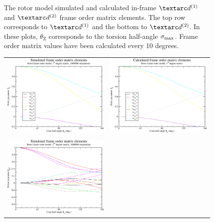 \begin{figure}
\begin{tabular}{@{}cc@{}}
  \end{tabular}
  \caption[Rotor simulated and calculated in-frame Daeg$^{(1)}$ and Daeg$^{(2)}$ elements.]{
    The rotor model simulated and calculated in-frame $\FOone$ and $\FOtwo$ frame order matrix elements.
    The top row corresponds to $\FOone$ and the bottom to $\FOtwo$.
    In these plots, $\theta_\textrm{Z}$ corresponds to the torsion half-angle $\sigma_\textrm{max}$.
    Frame order matrix values have been calculated every 10 degrees.
  }
  \label{fig: simulated and calculated in-frame 1st and 2nd degree rotor frame order}
\end{figure}

\begin{figure}
\centering
  \begin{tabular}{@{}cc@{}}
    \includegraphics[width=.5\textwidth]{images/frame_order_matrix/Sij_rotor_out_of_frame_theta_z_ens1000000.eps} &
    \includegraphics[width=.5\textwidth]{images/frame_order_matrix/Sij_rotor_out_of_frame_theta_z_calc.eps} \\
    \\[-5pt]
    \includegraphics[width=.5\textwidth]{images/frame_order_matrix/Sijkl_rotor_out_of_frame_theta_z_ens1000000.eps} &

\end{tabular}
\end{figure}
